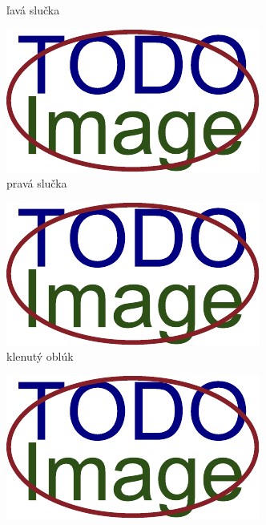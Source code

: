 \begin{figure}[h]
\begin{subfigure}[b]{0.32\linewidth}
      \caption{ľavá slučka}
      \label{obr:triedy_odtlackov/lava_slucka}
    \end{subfigure}
    \hfill
    \begin{subfigure}[b]{0.32\linewidth}
      \includegraphics[width=\linewidth]{obrazky-figures/placeholder.pdf}
      \caption{pravá slučka}
      \label{obr:triedy_odtlackov/prava_slucka}
    \end{subfigure}
    \hfill
    \begin{subfigure}[b]{0.32\linewidth}
      \includegraphics[width=\linewidth]{obrazky-figures/placeholder.pdf}
      \caption{klenutý oblúk}
      \label{obr:triedy_odtlackov/klenuty_obluk}
    \end{subfigure}
    \hfill
    \begin{subfigure}[b]{0.32\linewidth}
      \includegraphics[width=\linewidth]{obrazky-figures/placeholder.pdf}

\end{subfigure}
\end{figure}
